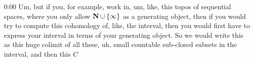 \begin{unfinished}{0:00}
Um, but if you, for example, work in, um, like, this topos of sequential spaces, where you only allow $\mathbf N \cup \{\infty\}$ as a generating object, then if you would try to compute this cohomology of, like, the interval, then you would first have to express your interval in terms of your generating object. So we would write this as this huge colimit of all these, uh, small countable sub-closed subsets in the interval, and then this $C$

\end{unfinished}
